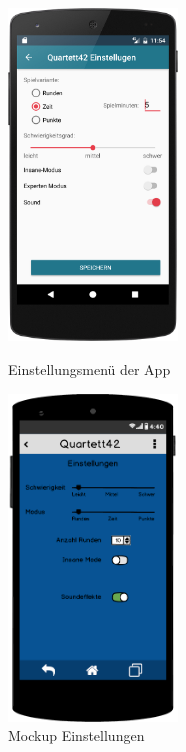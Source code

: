 \begin{figure}[h]
    \centering
    \begin{minipage}{0.49\textwidth}
        \centering
        \includegraphics[width=0.4\textwidth]{img/screenshots/device_settings.png}
		\caption{Einstellungsmenü der App}
		\label{figure:implementierungeinstellungen}
    \end{minipage}
    \begin{minipage}{0.49\textwidth}
        \centering
        \includegraphics[width=0.4\textwidth]{img/mockups/einstellungen.png}
        \caption{Mockup Einstellungen}
    \end{minipage}
\end{figure}

